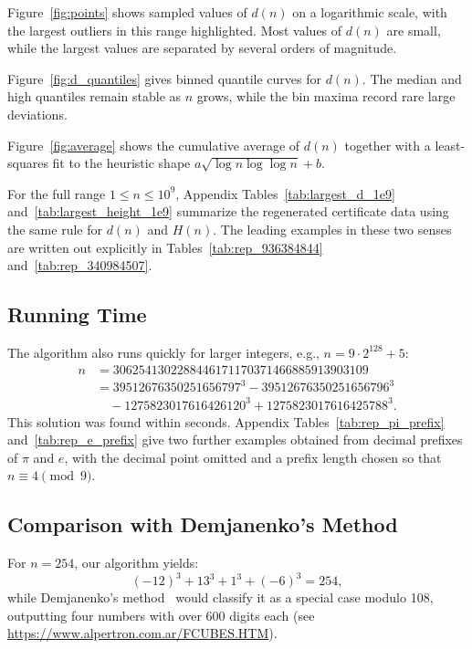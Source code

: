 \documentclass{mcom-l}
\theoremstyle{definition}
\theoremstyle{remark}
\numberwithin{equation}{section}
\begin{document}
Figure~\ref{fig:points} shows sampled values of $d(n)$ on a logarithmic
scale, with the largest outliers in this range highlighted.  Most values of
$d(n)$ are small, while the largest values are separated by several orders
of magnitude.

Figure~\ref{fig:d_quantiles} gives binned quantile curves for
$d(n)$.  The median and high quantiles remain stable as $n$ grows, while
the bin maxima record rare large deviations.

Figure~\ref{fig:average} shows the cumulative average of $d(n)$ together
with a least-squares fit to the heuristic shape
$a\sqrt{\log n\log\log n}+b$.

For the full range $1\leq n\leq 10^9$, Appendix
Tables~\ref{tab:largest_d_1e9} and~\ref{tab:largest_height_1e9} summarize the
regenerated certificate data using the same rule for $d(n)$ and $H(n)$.
The leading examples in these two senses are written out explicitly in
Tables~\ref{tab:rep_936384844} and~\ref{tab:rep_340984507}.







\subsection{Running Time}
\label{subsec:running_time}

The algorithm also runs quickly for larger integers, e.g., $n = 9 \cdot 2^{128} + 5$:
\begin{align*}
n &= 3062541302288446171170371466885913903109 \\
&= 39512676350251656797^3 - 39512676350251656796^3 \\
&\quad - 1275823017616426120^3 + 1275823017616425788^3.
\end{align*}
This solution was found within seconds.
Appendix Tables~\ref{tab:rep_pi_prefix} and~\ref{tab:rep_e_prefix} give
two further examples obtained from decimal prefixes of \(\pi\) and \(e\),
with the decimal point omitted and a prefix length chosen so that
\(n\equiv 4\pmod 9\).

\subsection{Comparison with Demjanenko's Method}
\label{subsec:comparison}

For $n = 254$, our algorithm yields:
\begin{equation}
(-12)^3 + 13^3 + 1^3 + (-6)^3 = 254,
\end{equation}
while Demjanenko's method~\cite{Demjanenko1966,Alpertron2020} would classify it as a special case modulo 108, outputting four numbers with over 600 digits each (see \url{https://www.alpertron.com.ar/FCUBES.HTM}).
\end{document}
